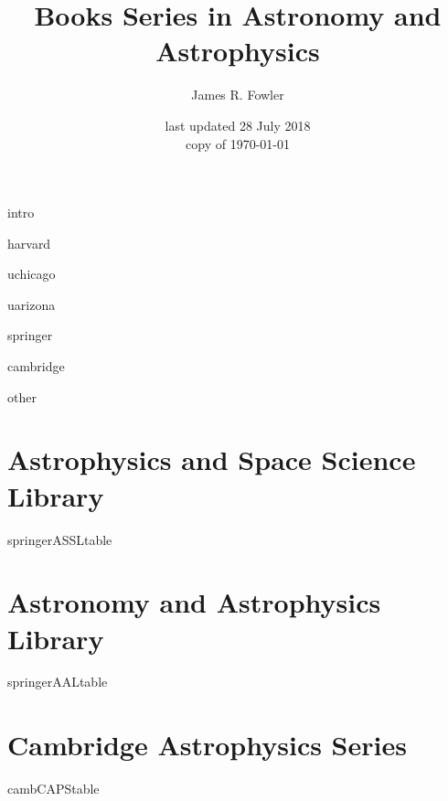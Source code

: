 \documentclass[letterpaper]{article}
\begin{document}
\title{Books Series in Astronomy and Astrophysics}
\author{James R. Fowler}
\date{last updated 28 July 2018\\ copy of \today}

  \maketitle

\tableofcontents
\listoftables


{intro}

{harvard}

{uchicago}

{uarizona}

{springer}

{cambridge}

{other}

\newpage
\appendixpage
\begin{appendix}

  \section{Astrophysics and Space Science Library}
  {springerASSLtable}

  \newpage
  \section{Astronomy and Astrophysics Library}
  {springerAALtable}

  \newpage
  \section{Cambridge Astrophysics Series}
  {cambCAPStable}

\end{appendix}
\end{document}
